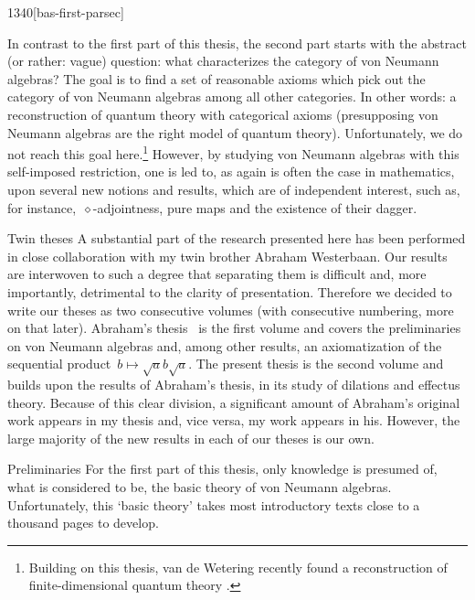 \begin{parsec}{1340}[bas-first-parsec]
\begin{point}{10}
\begin{point}{40}
In contrast to the first part of this thesis,
    the second part starts
    with the abstract (or rather: vague) question:
    what characterizes the category of von Neumann algebras?
The goal is to find a set of reasonable axioms
    which pick out the category of von Neumann algebras
    among all other categories.
In other words: a reconstruction of quantum theory with categorical axioms
    (presupposing von Neumann algebras are the right model of quantum theory).
    Unfortunately, we do not reach this goal here.\footnote{%
        Building on this thesis,
            van de Wetering recently found a reconstruction
            of finite-dimensional quantum theory \cite{wetering}.}
However, by studying von Neumann algebras
    with this self-imposed restriction,
    one is led to, as again is often the case in mathematics,
    upon several new notions and results,
    which are of independent interest,
    such as, for instance,~$\diamond$-adjointness,
    pure maps and the existence of their dagger.
\end{point}
\end{point}
\begin{point}{50}{Twin theses}%
A substantial part of the research presented here
    has been performed in close collaboration with
    my twin brother Abraham Westerbaan.
Our results are interwoven to such a degree
    that separating them is difficult
    and, more importantly, detrimental to the clarity of presentation.
Therefore we decided to write our theses as two consecutive volumes
    (with consecutive numbering, more on that later).
    Abraham's thesis~\cite{bram} is the first volume
    and covers the preliminaries on von Neumann
    algebras and, among other results, an axiomatization of
        the sequential product~$b\mapsto \sqrt{a}b\sqrt{a}$.
The present thesis is the second volume and builds upon
    the results of Abraham's thesis,
            in its study of dilations and effectus theory.
Because of this clear division,
    a significant amount of Abraham's original work appears in my thesis
        and, vice versa, my work appears in his.
However, the large majority of the
        new results in each of our theses is our own.
\end{point}
\begin{point}{60}{Preliminaries}%
For the first part of this thesis,
    only knowledge is presumed of, what is considered to be,
    the basic theory of von Neumann algebras.
Unfortunately, this `basic theory' takes most introductory texts
    close to a thousand pages to develop.

\end{point}
\end{parsec}
